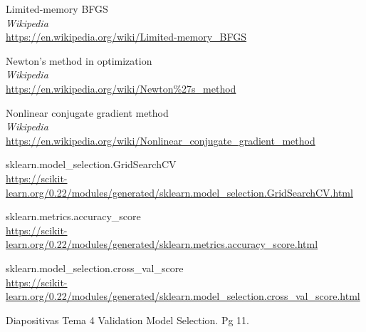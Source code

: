 \begin{thebibliography}{9}
Limited-memory BFGS
\\\textit{Wikipedia}
\\\url{https://en.wikipedia.org/wiki/Limited-memory\_BFGS}

Newton's method in optimization
\\\textit{Wikipedia}
\\\url{https://en.wikipedia.org/wiki/Newton\%27s\_method}

Nonlinear conjugate gradient method
\\\textit{Wikipedia}
\\\url{https://en.wikipedia.org/wiki/Nonlinear\_conjugate\_gradient\_method}

sklearn.model\_selection.GridSearchCV
\\\url{https://scikit-learn.org/0.22/modules/generated/sklearn.model\_selection.GridSearchCV.html}

sklearn.metrics.accuracy\_score
\\\url{https://scikit-learn.org/0.22/modules/generated/sklearn.metrics.accuracy\_score.html}

sklearn.model\_selection.cross\_val\_score
\\\url{https://scikit-learn.org/0.22/modules/generated/sklearn.model\_selection.cross\_val\_score.html}

Diapositivas Tema 4 Validation Model Selection. Pg 11.



\end{thebibliography}
